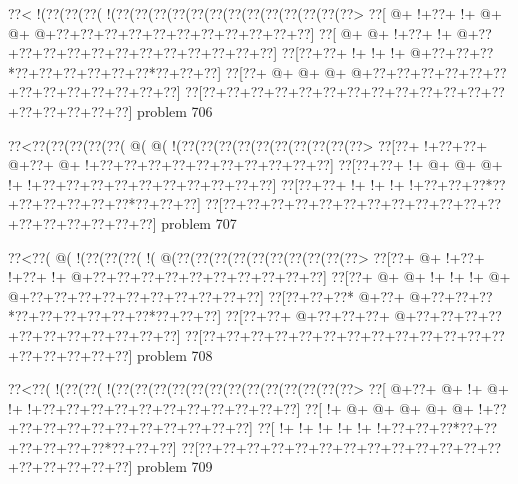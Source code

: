 \vbox{\vbox{\goo
\0??<\- !(\0??(\0??(\0??(\- !(\0??(\0??(\0??(\0??(\0??(\0??(\0??(\0??(\0??(\0??(\0??(\0??(\0??>
\0??[\- @+\- !+\0??+\- !+\- @+\- @+\- @+\0??+\0??+\0??+\0??+\0??+\0??+\0??+\0??+\0??+\0??+\0??]
\0??[\- @+\- @+\- !+\0??+\- !+\- @+\0??+\0??+\0??+\0??+\0??+\0??+\0??+\0??+\0??+\0??+\0??+\0??]
\0??[\0??+\0??+\- !+\- !+\- !+\- @+\0??+\0??+\0??*\0??+\0??+\0??+\0??+\0??+\0??*\0??+\0??+\0??]
\0??[\0??+\- @+\- @+\- @+\- @+\0??+\0??+\0??+\0??+\0??+\0??+\0??+\0??+\0??+\0??+\0??+\0??+\0??]
\0??[\0??+\0??+\0??+\0??+\0??+\0??+\0??+\0??+\0??+\0??+\0??+\0??+\0??+\0??+\0??+\0??+\0??+\0??]
}
\hfil problem 706\hfil\break
}



\vbox{\vbox{\goo
\0??<\0??(\0??(\0??(\0??(\0??(\- @(\- @(\- !(\0??(\0??(\0??(\0??(\0??(\0??(\0??(\0??(\0??(\0??>
\0??[\0??+\- !+\0??+\0??+\- @+\0??+\- @+\- !+\0??+\0??+\0??+\0??+\0??+\0??+\0??+\0??+\0??+\0??]
\0??[\0??+\0??+\- !+\- @+\- @+\- @+\- !+\- !+\0??+\0??+\0??+\0??+\0??+\0??+\0??+\0??+\0??+\0??]
\0??[\0??+\0??+\- !+\- !+\- !+\- !+\0??+\0??+\0??*\0??+\0??+\0??+\0??+\0??+\0??*\0??+\0??+\0??]
\0??[\0??+\0??+\0??+\0??+\0??+\0??+\0??+\0??+\0??+\0??+\0??+\0??+\0??+\0??+\0??+\0??+\0??+\0??]
}
\hfil problem 707\hfil\break
}



\vbox{\vbox{\goo
\0??<\0??(\- @(\- !(\0??(\0??(\0??(\- !(\- @(\0??(\0??(\0??(\0??(\0??(\0??(\0??(\0??(\0??(\0??>
\0??[\0??+\- @+\- !+\0??+\- !+\0??+\- !+\- @+\0??+\0??+\0??+\0??+\0??+\0??+\0??+\0??+\0??+\0??]
\0??[\0??+\- @+\- @+\- !+\- !+\- !+\- @+\- @+\0??+\0??+\0??+\0??+\0??+\0??+\0??+\0??+\0??+\0??]
\0??[\0??+\0??+\0??*\- @+\0??+\- @+\0??+\0??+\0??*\0??+\0??+\0??+\0??+\0??+\0??*\0??+\0??+\0??]
\0??[\0??+\0??+\- @+\0??+\0??+\0??+\- @+\0??+\0??+\0??+\0??+\0??+\0??+\0??+\0??+\0??+\0??+\0??]
\0??[\0??+\0??+\0??+\0??+\0??+\0??+\0??+\0??+\0??+\0??+\0??+\0??+\0??+\0??+\0??+\0??+\0??+\0??]
}
\hfil problem 708\hfil\break
}



\vbox{\vbox{\goo
\0??<\0??(\- !(\0??(\0??(\- !(\0??(\0??(\0??(\0??(\0??(\0??(\0??(\0??(\0??(\0??(\0??(\0??(\0??>
\0??[\- @+\0??+\- @+\- !+\- @+\- !+\- !+\0??+\0??+\0??+\0??+\0??+\0??+\0??+\0??+\0??+\0??+\0??]
\0??[\- !+\- @+\- @+\- @+\- @+\- @+\- !+\0??+\0??+\0??+\0??+\0??+\0??+\0??+\0??+\0??+\0??+\0??]
\0??[\- !+\- !+\- !+\- !+\- !+\- !+\0??+\0??+\0??*\0??+\0??+\0??+\0??+\0??+\0??*\0??+\0??+\0??]
\0??[\0??+\0??+\0??+\0??+\0??+\0??+\0??+\0??+\0??+\0??+\0??+\0??+\0??+\0??+\0??+\0??+\0??+\0??]
}
\hfil problem 709\hfil\break
}



